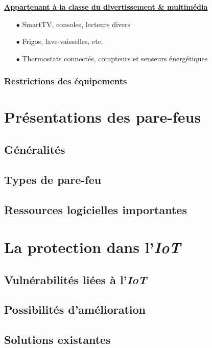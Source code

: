 \documentclass[]{article}
\newcommand{\minit}[1]{{\small\textbf{ \underline{#1}}}~\\}
\begin{document}
\minit{Appartenant à la classe du divertissement \& multimédia}

\begin{itemize}
\item[$\bullet$] SmartTV, consoles, lecteurs divers
\item[$\bullet$] Frigos, lave-vaisselles, etc. 
\item[$\bullet$] Thermostats connectés, compteurs et senseurs énergétiques
\end{itemize}
\newpage
\subsubsection{Restrictions des équipements}

\newpage
\section{Présentations des pare-feus}

\subsection{Généralités}

\subsection{Types de pare-feu}

\subsection{Ressources logicielles importantes}

\newpage
\section{La protection dans l'\textit{IoT}}

\subsection{Vulnérabilités liées à l'\textit{IoT}}

\subsection{Possibilités d'amélioration}

\subsection{Solutions existantes}
\end{document}
